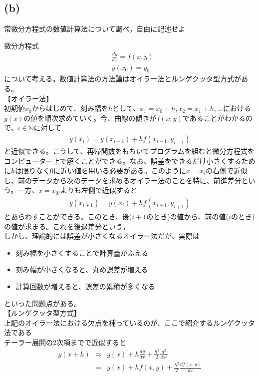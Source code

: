 \documentclass[pdflatex,ja=standard,fleqn]{bxjsarticle}
\begin{document}
\subsection*{(b)}
\begin{screen}
    常微分方程式の数値計算法について調べ，自由に記述せよ
\end{screen}
微分方程式
\begin{align*}
    &\frac{dy}{dx}=f(x,y)\\
    &y(x_{0})=y_{0}
\end{align*}
について考える。数値計算法の方法論はオイラー法とルンゲクッタ型方式がある。\\
【オイラー法】\\
初期値$x_{0}$からはじめて、刻み幅を$h$として、$x_{1}=x_{0}+h,x_{2}=x_{1}+h,...$における$y(x)$の値を順次求めていく。今、曲線の傾きが$f(x,y)$であることがわかるので、$i\in\mathbb{N}$に対して
\begin{eqnarray*}
    y(x_{i})=y(x_{i-1})+hf(x_{i-1},y_{i-1})
\end{eqnarray*}
と近似できる。こうして、再帰関数をもちいてプログラムを組むと微分方程式をコンピューター上で解くことができる。なお、誤差をできるだけ小さくするために$h$は限りなく$0$に近い値を用いる必要がある。このように$x=x_{i}$の右側で近似し、前のデータから次のデータを求めるオイラー法のことを特に、前進差分という。一方、$x=x_{0i}$よりも左側で近似すると
\begin{eqnarray*}
    y(x_{i+1})=y(x_{i})+hf(x_{i+1},y_{i+1})
\end{eqnarray*}
とあらわすことができる。このとき、後($i+1$のとき)の値から、前の値($i$のとき)の値が求まる。これを後退差分という。\\
しかし、理論的には誤差が小さくなるオイラー法だが、実際は
\begin{itemize}
    \item 刻み幅を小さくすることで計算量がふえる
    \item 刻み幅が小さくなると、丸め誤差が増える
    \item 計算回数が増えると、誤差の累積が多くなる
\end{itemize}
といった問題点がある。\\
【ルンゲクッタ型方式】\\
上記のオイラー法における欠点を補っているのが、ここで紹介するルンゲクッタ法である\\
テーラー展開の2次項までで近似すると
\begin{eqnarray*}
    y(x+h)&\approx& y(x)+h\frac{dy}{dx}+\frac{h^2}{2}\frac{d^2}{dx^2}\\
    &=& y(x)+hf(x,y)+\frac{h^2}{2}\frac{df(x,y)}{dx}
\end{eqnarray*}
\end{document}
